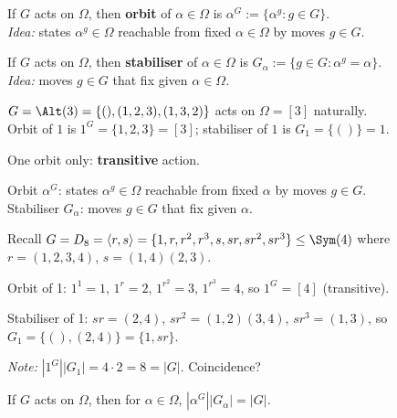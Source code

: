 \begin{slide}
    \begin{definition}[orbit]
        \vspace{0pt}
        If $G$ acts on $\Omega$, then \textbf{orbit} of $\alpha \in \Omega$ is $\alpha^G := \{\alpha^g : g \in G\}$. \\
        \textit{Idea:} states $\alpha^g \in \Omega$ reachable from fixed $\alpha \in \Omega$ by moves $g \in G$. \pause
    \end{definition}

    \begin{definition}[stabiliser]
        \vspace{0pt}
        If $G$ acts on $\Omega$, then \textbf{stabiliser} of $\alpha \in \Omega$ is $G_\alpha := \{g \in G : \alpha^g = \alpha\}$. \\
        \textit{Idea:} moves $g \in G$ that fix given $\alpha \in \Omega$. \pause
    \end{definition}

    \begin{example}
        \vspace{0pt}
        $G = \Alt(3) = \{(),(1,2,3),(1,3,2)\}$ acts on $\Omega = [3]$ naturally. \\
        Orbit of $1$ is \pause $1^G = \{1,2,3\} = [3]$; stabiliser of $1$ is \pause $G_1 = \{()\} = 1$.

        One orbit only: \textbf{transitive} action.
    \end{example}
\end{slide}

\begin{slide}
    Orbit $\alpha^G$: states $\alpha^g \in \Omega$ reachable from fixed $\alpha$ by moves $g \in G$. \\
    Stabiliser $G_\alpha$: moves $g \in G$ that fix given $\alpha$.

    \begin{example}
        \vspace{0pt}
        Recall $G = D_8 = \langle r,s \rangle = \{1,r,r^2,r^3,s,sr,sr^2,sr^3\} \leq \Sym(4)$ where $r = (1,2,3,4)$, $s = (1,4)(2,3)$.

        Orbit of 1: $1^1 = 1$, $1^r = 2$, $1^{r^2} = 3$, $1^{r^3} = 4$, so $1^G = [4]$ (transitive).

        Stabiliser of 1: $sr = (2,4)$, $sr^2 = (1,2)(3,4)$, $sr^3 = (1,3)$, so $G_1 = \{(),(2,4)\} = \{1,sr\}$.

        \textit{Note:} $|1^G||G_1| = 4 \cdot 2 = 8 = |G|$. Coincidence?
    \end{example}

    \begin{theorem}
        \vspace{0pt}
        If $G$ acts on $\Omega$, then for $\alpha \in \Omega$, $|\alpha^G||G_\alpha| = |G|$.
    \end{theorem}
\end{slide}

